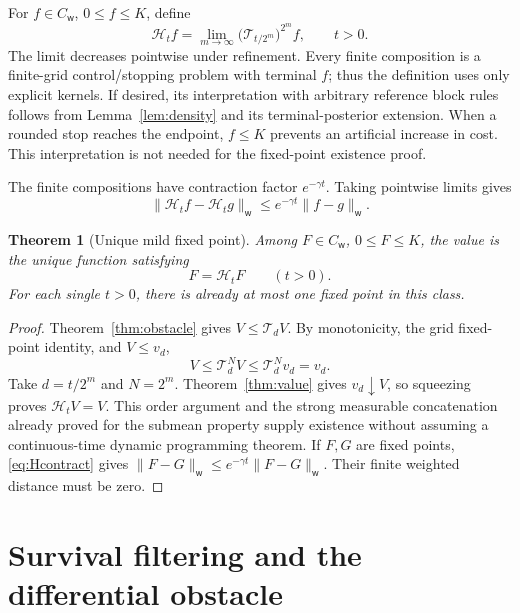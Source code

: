 \documentclass[11pt,a4paper]{article}
\newtheorem{theorem}{Theorem}[section]
\theoremstyle{definition}
\theoremstyle{remark}
\newcommand{\CW}{C_{\mathsf w}}
\newcommand{\wt}{\mathsf w}
\newcommand{\cT}{\mathcal T}
\newcommand{\cH}{\mathcal H}
\begin{document}
For \(f\in\CW\), \(0\leq f\leq K\), define
\begin{equation}\label{eq:H}
 \cH_tf=\lim_{m\to\infty}
           \big(\cT_{t/2^m}\big)^{2^m}f,\qquad t>0.
\end{equation}
The limit decreases pointwise under refinement.
Every finite composition is a finite-grid control/stopping problem
with terminal \(f\); thus the definition uses only explicit kernels.
If desired, its interpretation with arbitrary reference block rules
follows from Lemma~\ref{lem:density} and its terminal-posterior extension.
When a rounded stop reaches the endpoint, \(f\leq K\) prevents an
artificial increase in cost. This interpretation is not needed for
the fixed-point existence proof.

The finite compositions have contraction factor \(e^{-\gamma t}\).
Taking pointwise limits gives
\begin{equation}\label{eq:Hcontract}
 \|\cH_tf-\cH_tg\|_{\wt}
           \leq e^{-\gamma t}\|f-g\|_{\wt}.
\end{equation}

\begin{theorem}[Unique mild fixed point]\label{thm:mild}
Among \(F\in\CW\), \(0\leq F\leq K\), the value is the unique function
satisfying
\begin{equation}\label{eq:mild}
 F=\cH_tF\qquad(t>0).
\end{equation}
For each single \(t>0\), there is already at most one fixed point
in this class.
\end{theorem}
\begin{proof}
Theorem~\ref{thm:obstacle} gives \(V\leq\cT_dV\).
By monotonicity, the grid fixed-point identity, and \(V\leq v_d\),
\[
 V\leq\cT_d^NV\leq\cT_d^Nv_d=v_d.
\]
Take \(d=t/2^m\) and \(N=2^m\). Theorem~\ref{thm:value} gives
\(v_d\downarrow V\), so squeezing proves \(\cH_tV=V\).
This order argument and the strong measurable concatenation already
proved for the submean property supply existence without assuming
a continuous-time dynamic programming theorem.
If \(F,G\) are fixed points, \eqref{eq:Hcontract} gives
\(\|F-G\|_{\wt}\leq e^{-\gamma t}\|F-G\|_{\wt}\).
Their finite weighted distance must be zero.
\end{proof}

\section{Survival filtering and the differential obstacle}
\end{document}
